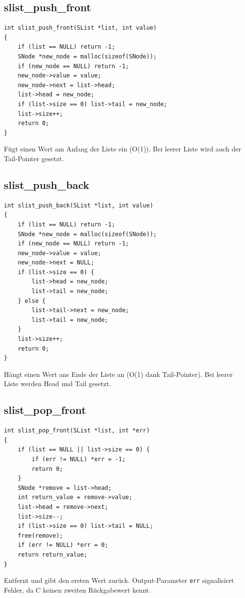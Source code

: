 \documentclass[10pt, a4paper]{article}
\begin{document}
\subsection{slist\_push\_front}
\begin{lstlisting}
int slist_push_front(SList *list, int value)
{
    if (list == NULL) return -1;
    SNode *new_node = malloc(sizeof(SNode));
    if (new_node == NULL) return -1;
    new_node->value = value;
    new_node->next = list->head;
    list->head = new_node;
    if (list->size == 0) list->tail = new_node;
    list->size++;
    return 0;
}
\end{lstlisting}
F\"ugt einen Wert am Anfang der Liste ein (O(1)). Bei leerer Liste wird auch der Tail-Pointer gesetzt.

\subsection{slist\_push\_back}
\begin{lstlisting}
int slist_push_back(SList *list, int value)
{
    if (list == NULL) return -1;
    SNode *new_node = malloc(sizeof(SNode));
    if (new_node == NULL) return -1;
    new_node->value = value;
    new_node->next = NULL;
    if (list->size == 0) {
        list->head = new_node;
        list->tail = new_node;
    } else {
        list->tail->next = new_node;
        list->tail = new_node;
    }
    list->size++;
    return 0;
}
\end{lstlisting}
H\"angt einen Wert ans Ende der Liste an (O(1) dank Tail-Pointer). Bei leerer Liste werden Head und Tail gesetzt.

\subsection{slist\_pop\_front}
\begin{lstlisting}
int slist_pop_front(SList *list, int *err)
{
    if (list == NULL || list->size == 0) {
        if (err != NULL) *err = -1;
        return 0;
    }
    SNode *remove = list->head;
    int return_value = remove->value;
    list->head = remove->next;
    list->size--;
    if (list->size == 0) list->tail = NULL;
    free(remove);
    if (err != NULL) *err = 0;
    return return_value;
}
\end{lstlisting}
Entfernt und gibt den ersten Wert zur\"uck. Output-Parameter \texttt{err} signalisiert Fehler, da C keinen zweiten R\"uckgabewert kennt.
\end{document}
